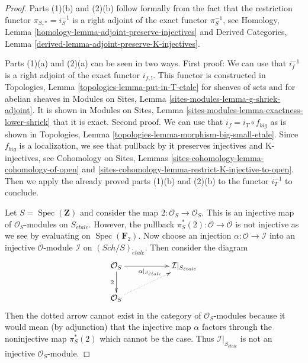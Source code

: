 \documentclass[10pt,a4paper]{amsart}
\theoremstyle{plain}
\theoremstyle{definition}
\theoremstyle{remark}
\numberwithin{equation}{subsection}
\def\Spec{\mathop{\mathrm{Spec}}}
\def\Sch{\mathit{Sch}}
\def\etale{{\acute{e}tale}}
\begin{document}
\begin{proof}
Parts (1)(b) and (2)(b)
follow formally from the fact that the restriction functor
$\pi_{S, *} = i_S^{-1}$ is a right adjoint of the exact functor
$\pi_S^{-1}$, see
Homology, Lemma \ref{homology-lemma-adjoint-preserve-injectives} and
Derived Categories, Lemma \ref{derived-lemma-adjoint-preserve-K-injectives}.

\medskip\noindent
Parts (1)(a) and (2)(a) can be seen in two ways. First proof: We can use
that $i_f^{-1}$ is a right adjoint of the exact functor $i_{f, !}$.
This functor is constructed in
Topologies, Lemma \ref{topologies-lemma-put-in-T-etale}
for sheaves of sets and for abelian sheaves in
Modules on Sites, Lemma \ref{sites-modules-lemma-g-shriek-adjoint}.
It is shown in Modules on Sites, Lemma
\ref{sites-modules-lemma-exactness-lower-shriek} that it is exact.
Second proof. We can use that $i_f = i_T \circ f_{big}$ as is shown
in Topologies, Lemma \ref{topologies-lemma-morphism-big-small-etale}.
Since $f_{big}$ is a localization, we see that pullback by it
preserves injectives and K-injectives, see
Cohomology on Sites, Lemmas \ref{sites-cohomology-lemma-cohomology-of-open} and
\ref{sites-cohomology-lemma-restrict-K-injective-to-open}.
Then we apply the already proved parts (1)(b) and (2)(b)
to the functor $i_T^{-1}$ to conclude.

\medskip\noindent
Let $S = \Spec(\mathbf{Z})$ and consider the map
$2 : \mathcal{O}_S \to \mathcal{O}_S$. This is an injective map
of $\mathcal{O}_S$-modules on $S_\etale$. However, the pullback
$\pi_S^*(2) : \mathcal{O} \to \mathcal{O}$ is not injective
as we see by evaluating on $\Spec(\mathbf{F}_2)$. Now choose
an injection $\alpha : \mathcal{O} \to \mathcal{I}$ into an injective
$\mathcal{O}$-module $\mathcal{I}$ on $(\Sch/S)_\etale$.
Then consider the diagram
$$
\xymatrix{
\mathcal{O}_S \ar[d]_2 \ar[rr]_{\alpha|_{S_\etale}} & &
\mathcal{I}|_{S_\etale} \\
\mathcal{O}_S \ar@{..>}[rru]
}
$$
Then the dotted arrow cannot exist in the category of $\mathcal{O}_S$-modules
because it would mean
(by adjunction) that the injective map $\alpha$ factors through
the noninjective map $\pi_S^*(2)$ which cannot be the case.
Thus $\mathcal{I}|_{S_\etale}$ is not an injective $\mathcal{O}_S$-module.
\end{proof}
\end{document}
